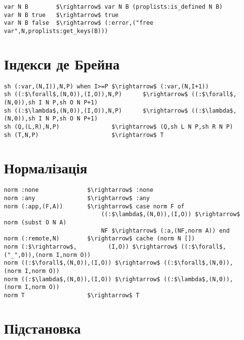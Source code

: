 \begin{lstlisting}[mathescape=true]
var N B        $\rightarrow$ var N B (proplists:is_defined N B)
var N B true   $\rightarrow$ true
var N B false  $\rightarrow$ (:error,("free var",N,proplists:get_keys(B)))
\end{lstlisting}

   \section{Індекси де Брейна}

\begin{lstlisting}[mathescape=true]
sh (:var,(N,I)),N,P) when I>=P $\rightarrow$ (:var,(N,I+1))
sh ((:$\forall$,(N,0)),(I,O)),N,P)      $\rightarrow$ ((:$\forall$,(N,0)),sh I N P,sh O N P+1)
sh ((:$\lambda$,(N,0)),(I,O)),N,P)      $\rightarrow$ ((:$\lambda$,(N,0)),sh I N P,sh O N P+1)
sh (Q,(L,R),N,P)               $\rightarrow$ (Q,sh L N P,sh R N P)
sh (T,N,P)                     $\rightarrow$ T
\end{lstlisting}

   \section{Нормалізація}

\begin{lstlisting}[mathescape=true]
norm :none              $\rightarrow$ :none
norm :any               $\rightarrow$ :any
norm (:app,(F,A))       $\rightarrow$ case norm F of
                            ((:$\lambda$,(N,0)),(I,O)) $\rightarrow$ norm (subst O N A)
                            NF $\rightarrow$ (:a,(NF,norm A)) end
norm (:remote,N)        $\rightarrow$ cache (norm N [])
norm (:$\rightarrow$,         (I,O)) $\rightarrow$ ((:$\forall$,("_",0)),(norm I,norm O))
norm ((:$\forall$,(N,0)),(I,O)) $\rightarrow$ ((:$\forall$,(N,0)),      (norm I,norm O))
norm ((:$\lambda$,(N,0)),(I,O)) $\rightarrow$ ((:$\lambda$,(N,0)),      (norm I,norm O))
norm T                  $\rightarrow$ T
\end{lstlisting}

\lstset{xleftmargin=0cm}

\newpage

   \section{Підстановка}


